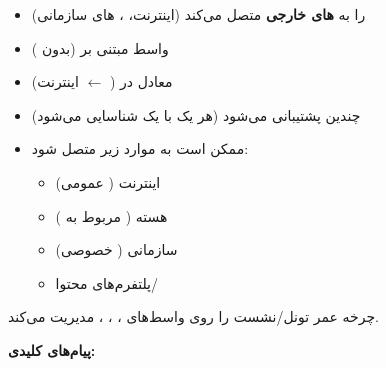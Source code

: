 
\begin{itemize}
\tightlist
\item
   را به \textbf{های خارجی} متصل می‌کند (اینترنت، ، های سازمانی)
\item
  واسط مبتنی بر  (بدون )
\item
  معادل  در  ( \ensuremath{\leftarrow} اینترنت)
\item
  چندین  پشتیبانی می‌شود (هر یک با یک  شناسایی می‌شود)
\item
  ممکن است به موارد زیر متصل شود:

  \begin{itemize}
  \tightlist
  \item
    اینترنت ( عمومی)
  \item
    هسته  ( مربوط به )
  \item
     سازمانی ( خصوصی)
  \item
    پلتفرم‌های محتوا/\allowbreak{}
  \end{itemize}
\end{itemize}







\CNchained{}

 چرخه عمر تونل/\allowbreak{}نشست را روی واسط‌های ، ، ،  مدیریت می‌کند.

\textbf{پیام‌های کلیدی:}

